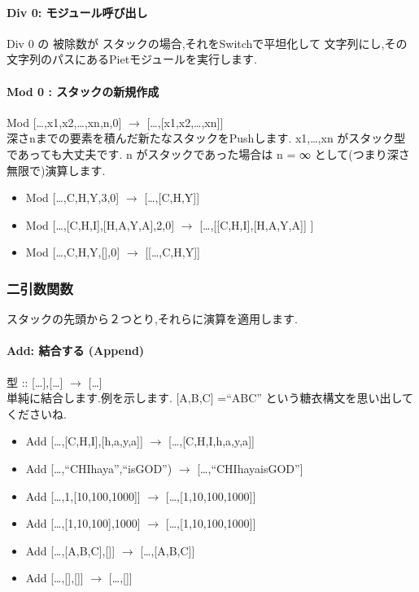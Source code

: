 \paragraph{Div 0: モジュール呼び出し}

Div 0 の 被除数が スタックの場合,それをSwitchで平坦化して
文字列にし,その文字列のパスにあるPietモジュールを実行します.

\paragraph{Mod 0 : スタックの新規作成}

Mod {[}\ldots{},x1,x2,\ldots{},xn,n,0{]} $\to$
{[}\ldots{},{[}x1,x2,\ldots{},xn{]}{]}\\深さnまでの要素を積んだ新たなスタックをPushします.
x1,\ldots{},xn がスタック型であっても大丈夫です. n
がスタックであった場合は n = ∞ として(つまり深さ無限で)演算します.

\begin{itemize}
\item
  Mod {[}\ldots{},C,H,Y,3,0{]} $\to$
  {[}\ldots{},{[}C,H,Y{]}{]}
\item
  Mod {[}\ldots{},{[}C,H,I{]},{[}H,A,Y,A{]},2,0{]} $\to$
  {[}\ldots{},{[}{[}C,H,I{]},{[}H,A,Y,A{]}{]} {]}
\item
  Mod {[}\ldots{},C,H,Y,{[}{]},0{]} $\to$
  {[}{[}\ldots{},C,H,Y{]}{]}
\end{itemize}

\subsubsection{二引数関数}

スタックの先頭から２つとり,それらに演算を適用します.

\paragraph{Add: 結合する (Append)}

型 :: {[}\ldots{}{]},{[}\ldots{}{]} $\to$
{[}\ldots{}{]}\\単純に結合します.例を示します. {[}A,B,C{]} =``ABC''
という糖衣構文を思い出してくださいね.

\begin{itemize}
\item
  Add {[}\ldots{},{[}C,H,I{]},{[}h,a,y,a{]}{]} $\to$
  {[}\ldots{},{[}C,H,I,h,a,y,a{]}{]}
\item
  Add {[}\ldots{},``CHIhaya'',``isGOD'') $\to$
  {[}\ldots{},``CHIhayaisGOD''{]}
\item
  Add {[}\ldots{},1,{[}10,100,1000{]}{]} $\to$
  {[}\ldots{},{[}1,10,100,1000{]}{]}
\item
  Add {[}\ldots{},{[}1,10,100{]},1000{]} $\to$
  {[}\ldots{},{[}1,10,100,1000{]}{]}
\item
  Add {[}\ldots{},{[}A,B,C{]},{[}{]}{]} $\to$
  {[}\ldots{},{[}A,B,C{]}{]}
\item
  Add {[}\ldots{},{[}{]},{[}{]}{]} $\to$ {[}\ldots{},{[}{]}{]}
\end{itemize}

